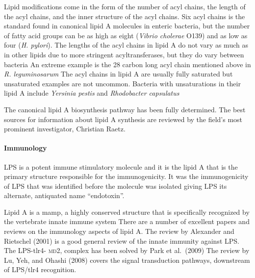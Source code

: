 Lipid modifications come in the form of the number of acyl chains, the length of the acyl chains, and the inner structure of the acyl chains. Six acyl chains is the standard found
in canonical lipid A molecules in enteric bacteria, but the number of fatty acid groups can be as high as eight (\eg \textit{Vibrio cholerae}
O139) and as low as four (\eg \textit{H. pylori}). The lengths of the acyl chains in lipid A do not vary
as much as in other lipids due to more stringent acyltransferases, but they do vary between bacteria An extreme example is the 28 carbon long acyl
chain mentioned above in \textit{R. leguminosarum} The acyl chains in lipid A are usually fully saturated but unsaturated examples are not uncommon.
Bacteria with unsaturations in their lipid A include \caulobacter{} \textit{Yersinia pestis} and \textit{Rhodobacter
capsulatus}

The canonical lipid A biosynthesis pathway has been fully determined. The best sources for information about lipid A synthesis are reviewed by the field's most prominent
investigator, Christian Raetz.

    \paragraph{Immunology}

\ac{LPS} is a potent immune stimulatory molecule and it is the lipid A that is the primary structure responsible for the immunogenicity. It was the immunogenicity of \ac{LPS} that
was identified before the molecule was isolated giving \ac{LPS} its alternate, antiquated name ``endotoxin''.

Lipid A is a \ac{mamp}, a highly conserved structure that is specifically recognized by the vertebrate innate immune system There are a number of
excellent papers and reviews on the immunology aspects of lipid A. The review by Alexander and Rietschel (2001) is a good general review of the
innate immunity against \ac{LPS}. The \ac{LPS}-\ac{tlr4}- \textsc{md}2, complex has been solved by Park et al.~(2009) The review by Lu, Yeh, and
Ohashi (2008) covers the signal transduction pathways, downstream of \ac{LPS}/\ac{tlr4} recognition.

